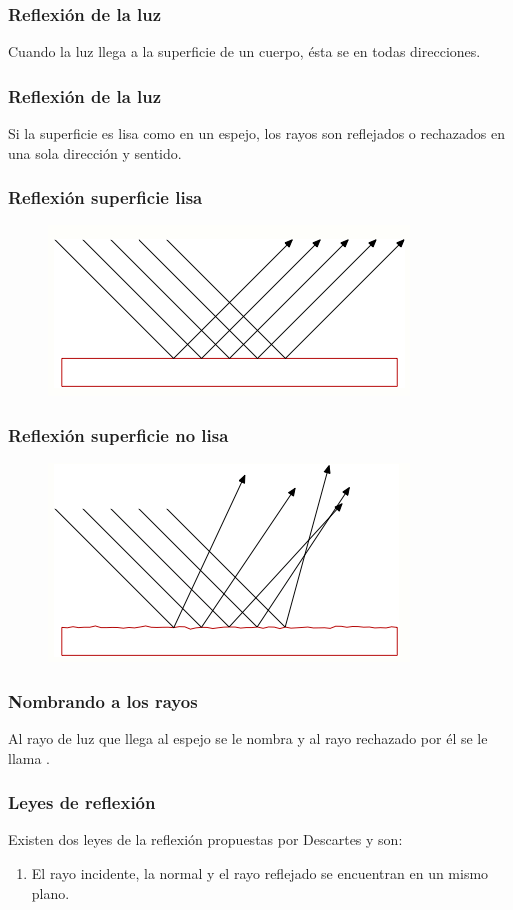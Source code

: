 \documentclass[14pt]{beamer}
\begin{document}
\begin{frame}
\frametitle{Reflexión de la luz}
Cuando la luz llega a la superficie de un cuerpo, ésta se  en todas direcciones. 
\end{frame}
\begin{frame}
\frametitle{Reflexión de la luz}
Si la superficie es lisa como en un espejo, los rayos son reflejados o rechazados en una sola dirección y sentido.
\end{frame}
\begin{frame}
\frametitle{Reflexión superficie lisa}
\begin{figure}
    \centering
    \includegraphics[scale=1]{Imagenes/Optica_Reflexion_001.png}
\end{figure}
\end{frame}
\begin{frame}
\frametitle{Reflexión superficie no lisa}
\begin{figure}
    \centering
    \includegraphics[scale=1]{Imagenes/Optica_Reflexion_002.png}
\end{figure}
\end{frame}
\begin{frame}
\frametitle{Nombrando a los rayos}
Al rayo de luz que llega al espejo se le nombra  y al rayo rechazado por él se le llama .
\end{frame}
\begin{frame}
\frametitle{Leyes de reflexión}
Existen dos leyes de la reflexión propuestas por Descartes y son:
\pause
{}
\begin{enumerate}[<+->]
\item El rayo incidente, la normal y el rayo reflejado se encuentran en un mismo plano.
\seti
\end{enumerate}
\end{frame}
\end{document}
